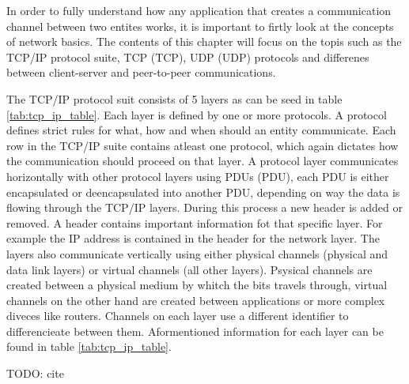 In order to fully understand how any application that creates a communication channel between two entites works, it is important to firtly look at the concepts of network basics. The contents of this chapter will focus on the topis such as the TCP/IP protocol suite, TCP (\acl{TCP}), UDP (\acl{UDP}) protocols and differenes between client-server and peer-to-peer communications.

The TCP/IP protocol suit consists of 5 layers as can be seed in table \ref{tab:tcp_ip_table}. Each layer is defined by one or more protocols. A protocol defines strict rules for what, how and when should an entity communicate. Each row in the TCP/IP suite contains atleast one protocol, which again dictates how the communication should proceed on that layer. A protocol layer communicates horizontally with other protocol layers using PDUs (\acl{PDU}), each PDU is either encapsulated or deencapsulated into another PDU, depending on way the data is flowing through the TCP/IP layers. During this process a new header is added or removed. A header contains important information fot that specific layer. For example the IP address is contained in the header for the network layer. The layers also communicate vertically using either physical channels (physical and data link layers) or virtual channels (all other layers). Psysical channels are created between a physical medium by whitch the bits travels through, virtual channels on the other hand are created between applications or more complex diveces like routers. Channels on each layer use a different identifier to differencieate between them. Aformentioned information for each layer can be found in table \ref{tab:tcp_ip_table}.




TODO: cite
